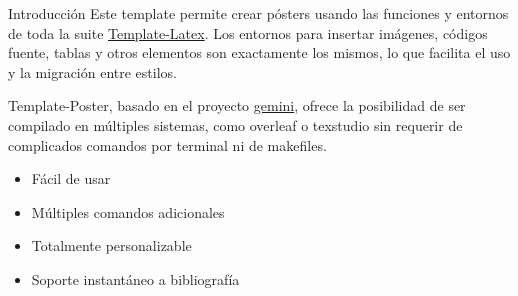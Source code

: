 %
%

\begin{block}{Introducción}
	Este template permite crear pósters usando las funciones y entornos de toda la suite \href{https://template-latex.github.io/}{Template-Latex}. Los entornos para insertar imágenes, códigos fuente, tablas y otros elementos son exactamente los mismos, lo que facilita el uso y la migración entre estilos.
	
\end{block}

\begin{exampleblock}{}
	Template-Poster, basado en el proyecto \href{https://github.com/anishathalye/gemini}{gemini}, ofrece la posibilidad de ser compilado en múltiples sistemas, como overleaf o texstudio sin requerir de complicados comandos por terminal ni de makefiles.
	
	\begin{itemize}
		\item Fácil de usar \cite{template}
		\item Múltiples comandos adicionales
		\item Totalmente personalizable
		\item Soporte instantáneo a bibliografía \cite{einstein}
	\end{itemize}
\end{exampleblock}

